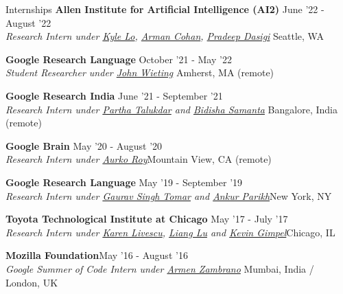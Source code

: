 \documentclass{resume} %
\begin{document}
\begin{rSection}{Internships}
\vspace*{0.1in}
{\bf Allen Institute for Artificial Intelligence (AI2)} { \hfill June '22 - August '22}\\ \textit{Research Intern under \href{https://kyleclo.github.io/}{Kyle Lo}, \href{http://armancohan.com/}{Arman Cohan}, \href{https://pdasigi.github.io/}{Pradeep Dasigi}} {\hfill Seattle, WA}

{\bf Google Research Language} { \hfill October '21 - May '22}\\ \textit{Student Researcher under \href{https://scholar.google.com/citations?user=Z0dGdDUAAAAJ&hl=en}{John Wieting}} {\hfill Amherst, MA (remote)}

{\bf Google Research India} { \hfill June '21 - September '21}\\ \textit{Research Intern under \href{https://scholar.google.com/citations?user=CIZwXAcAAAAJ&hl=en}{Partha Talukdar} and \href{https://sites.google.com/view/bidisha-samanta/}{Bidisha Samanta}} {\hfill Bangalore, India (remote)}

{\bf Google Brain} { \hfill May '20 - August '20}\\ \textit{Research Intern under \href{https://sites.google.com/site/royaurko/}{Aurko Roy}}{\hfill Mountain View, CA (remote)}

{\bf Google Research Language}{ \hfill May '19 - September '19}\\ \textit{Research Intern under \href{https://ai.google/research/people/GauravSinghTomar/}{Gaurav Singh Tomar} and \href{www.ankurparikh.com}{Ankur Parikh}}{\hfill New York, NY}

{\bf Toyota Technological Institute at Chicago}{ \hfill May '17 - July '17}\\ \textit{Research Intern under \href{http://ttic.uchicago.edu/~klivescu/}{Karen Livescu}, \href{http://ttic.uchicago.edu/~llu/}{Liang Lu} and \href{http://ttic.uchicago.edu/~kgimpel/}{Kevin Gimpel}}{\hfill Chicago, IL}

{\bf Mozilla Foundation}{\hfill May '16 - August '16} \\ \textit{Google Summer of Code Intern under \href{https://github.com/armenzg}{Armen Zambrano}}{ \hfill Mumbai, India / London, UK}
\end{rSection}

\vspace*{0.1in}
\end{document}
